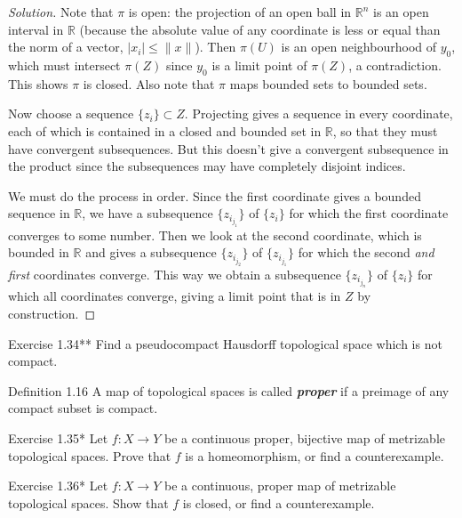 \begin{proof}[Solution]
Note that \(\pi\) is open: the projection of an open ball in \(\mathbb{R}^n\) is an open interval in \(\mathbb{R}\) (because the absolute value of any coordinate is less or equal than the norm of a vector, \(|x_i|\leq \|x\|\)). Then \(\pi(U)\) is an open neighbourhood of \(y_0\), which must intersect \(\pi(Z)\) since \(y_0\) is a limit point of \(\pi(Z)\), a contradiction. This shows \(\pi\) is closed. Also note that \(\pi\) maps bounded sets to bounded sets.

Now choose a sequence $\{z_i\}\subset Z$. Projecting gives a sequence in every coordinate, each of which is contained in a closed and bounded set in \(\mathbb{R}\), so that they must have convergent subsequences. {\color{2}But this doesn't give a convergent subsequence in the product since the subsequences may have completely disjoint indices.}\fi

We must do the process in order. Since the first coordinate gives a bounded sequence in \(\mathbb{R}\), we have a subsequence \(\{z_{i_{j_1}}\}\) of \(\{z_i\}\) for which the first coordinate converges to some number. Then we look at the second coordinate, which is bounded in \(\mathbb{R}\) and gives a subsequence \(\{z_{i_{j_2}}\}\) of \(\{z_{i_{j_1}}\}\) for which the second \textit{and first} coordinates converge. This way we obtain a subsequence \(\{z_{i_{j_n}}\}\) of \(\{z_i\}\) for which all coordinates converge, giving a limit point that is in \(Z\) by construction.
\end{proof}

\begin{thing4}{Exercise 1.34**}\label{exer:1.34}\leavevmode
Find a pseudocompact Hausdorff topological space which is not compact.
\end{thing4}

\begin{thing3}{Definition 1.16}\leavevmode
A map of topological spaces is called \textit{\textbf{proper}} if a preimage of any compact subset is compact.
\end{thing3}

\begin{thing4}{Exercise 1.35*}\label{exer:1.35}\leavevmode
Let $f:X\to Y$ be a continuous proper, bijective map of metrizable topological spaces. Prove that $f$ is a homeomorphism, or find a counterexample.
\end{thing4}

\begin{thing4}{Exercise 1.36*}\label{exer:1.36}\leavevmode
Let $f:X \to Y$ be a continuous, proper map of metrizable topological spaces. Show that $f$ is closed, or find a counterexample.
\end{thing4}

